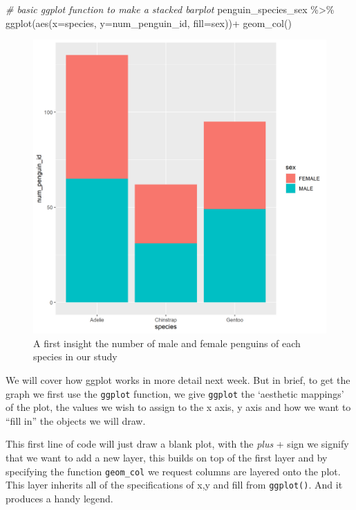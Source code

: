 \documentclass[
]{book}
\newenvironment{Shaded}{\begin{snugshade}}{\end{snugshade}}
\newcommand{\AttributeTok}[1]{\textcolor[rgb]{0.77,0.63,0.00}{#1}}
\newcommand{\CommentTok}[1]{\textcolor[rgb]{0.56,0.35,0.01}{\textit{#1}}}
\newcommand{\FunctionTok}[1]{\textcolor[rgb]{0.00,0.00,0.00}{#1}}
\newcommand{\NormalTok}[1]{#1}
\newcommand{\SpecialCharTok}[1]{\textcolor[rgb]{0.00,0.00,0.00}{#1}}
\begin{document}
\begin{Shaded}
\begin{Highlighting}[]
\CommentTok{\# basic ggplot function to make a stacked barplot}
\NormalTok{penguin\_species\_sex }\SpecialCharTok{\%\textgreater{}\%} 
  \FunctionTok{ggplot}\NormalTok{(}\FunctionTok{aes}\NormalTok{(}\AttributeTok{x=}\NormalTok{species, }
             \AttributeTok{y=}\NormalTok{num\_penguin\_id, }
             \AttributeTok{fill=}\NormalTok{sex))}\SpecialCharTok{+}
  \FunctionTok{geom\_col}\NormalTok{()}
\end{Highlighting}
\end{Shaded}

\begin{figure}
\includegraphics[width=0.8\linewidth]{images/stacked_bar} \caption{A first insight the number of male and female penguins of each species in our study}\label{fig:unnamed-chunk-82}
\end{figure}

We will cover how ggplot works in more detail next week. But in brief, to get the graph we first use the \texttt{ggplot} function, we give \texttt{ggplot} the `aesthetic mappings' of the plot, the values we wish to assign to the x axis, y axis and how we want to ``fill in'' the objects we will draw.

This first line of code will just draw a blank plot, with the \emph{plus} + sign we signify that we want to add a new layer, this builds on top of the first layer and by specifying the function \texttt{geom\_col} we request columns are layered onto the plot. This layer inherits all of the specifications of x,y and fill from \texttt{ggplot()}. And it produces a handy legend.
\end{document}
